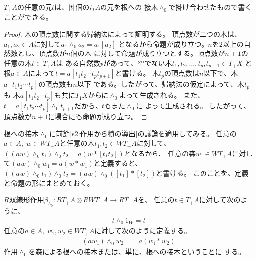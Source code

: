 		\begin{proposition}[木の生成]\label{prop:木の生成} %
			$T_+A$の任意の元$t$は、$\left|{t}\right|$個の$i_TA$の元を根への
			接木$\land_0$で掛け合わせたもので書くことができる。
		\end{proposition} %
		\begin{proof} %
			木の頂点数に関する帰納法によって証明する。
			頂点数が二つの木は、$a_1,a_2\in A$に対して$a_1\land_0 a_2=a_1[a_2]$
			となるから命題が成り立つ。$n$を$2$以上の自然数とし、頂点数が$n$個の木
			に対して命題が成り立つとする。頂点数が$n+1$の任意の木$t\in T_+A$は
			ある自然数$p$があって、空でない木$t_1,t_2,\dots,t_p,t_{p+1}\in T_+X$
			と根$a\in A$によって$t=a[t_1t_2\cdots t_pt_{p+1}]$と書ける。
			木$t_p$の頂点数は$n$以下で、木$a[t_1t_2\cdots t_p]$の頂点数も$n$以下
			である。したがって、帰納法の仮定によって、木$t_p$も
			木$a[t_1t_2\cdots t_p]$も共に$T_1X$からに$\land_0$よって生成される。
			また、$t=a[t_1t_2\cdots t_p]\land_0 t_{p+1}$だから、$t$もまた$\land_0$に
			よって生成される。
			したがって、頂点数が$n+1$に場合にも命題が成り立つ。
		\end{proof} %

		根への接木$\land_0$に前節\ref{s2:作用から積の導出}の議論を適用してみる。
		任意の$a\in A,\;w\in WT_+A$と任意の木$t_1,t_2\in WT_+A$に対して、
		$((aw)\land_0 t_1)\land_0 t_2=a(w*[t_1t_2])$となるから、
		任意の森$w_1\in WT_+A$に対して$(aw)\land_0 w_1=a(w*w_1)$と定義すると、
		$((aw)\land_0 t_1)\land_0 t_2=(aw)\land_0([t_1]*[t_2])$と書ける。
		このことを、定義と命題の形にまとめておく。

		\begin{definition}[森による根への接木]\label{def:森による根への接木} %
			$R$双線形作用$\beta_{\land_0}: RT_+A\otimes RWT_+A \to RT_+A$を、
			任意の$t\in T_+A$に対して次のように、
			\begin{equation*}\begin{split} %
				t\land_0 1_W = t
			\end{split}\end{equation*} %
			任意の$a\in A,\;w_1,w_2\in WT_+A$に対して次のように定義する。
			\begin{equation*}\begin{split} %
				(aw_1)\land_0 w_2 &= a(w_1*w_2)
			\end{split}\end{equation*} %
			作用$\land_0$を森による根への接木または、単に、根への接木ということに
			する。
		\end{definition} %


